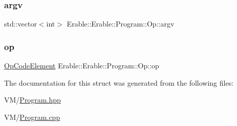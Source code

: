 \subsubsection{\texorpdfstring{argv}{argv}}
{\footnotesize\ttfamily std\+::vector$<$int$>$ Erable\+::\+Erable\+::\+Program\+::\+Op\+::argv}

\mbox{\label{struct_erable_1_1_erable_1_1_program_1_1_op_ad908a223827b7846bc7a5a0b5b43c895}} 
\subsubsection{\texorpdfstring{op}{op}}
{\footnotesize\ttfamily \mbox{\hyperlink{class_erable_1_1_op_code_element}{Op\+Code\+Element}} Erable\+::\+Erable\+::\+Program\+::\+Op\+::op}



The documentation for this struct was generated from the following files\+:\begin{DoxyCompactItemize}
\item 
V\+M/\mbox{\hyperlink{_program_8hpp}{Program.\+hpp}}\item 
V\+M/\mbox{\hyperlink{_program_8cpp}{Program.\+cpp}}\end{DoxyCompactItemize}
